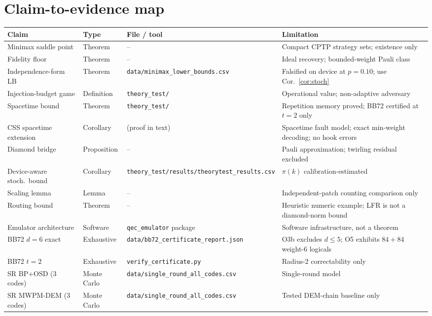 \documentclass[11pt,a4paper]{article}
\begin{document}
\section*{Claim-to-evidence map}
\begin{table}[H]\centering\scriptsize
\setlength{\tabcolsep}{3pt}
\renewcommand{\arraystretch}{1.08}
\begin{tabularx}{\textwidth}{@{}p{3.1cm}p{1.7cm}X p{2.9cm}@{}}
\toprule Claim & Type & File / tool & Limitation \\\midrule
Minimax saddle point & Theorem & -- & Compact CPTP strategy sets; existence only \\
Fidelity floor & Theorem & -- & Ideal recovery; bounded-weight Pauli class \\
Independence-form LB & Theorem & \texttt{data/minimax\_lower\_bounds.csv} & Falsified on device at $p{=}0.10$; use Cor.~\ref{cor:stoch} \\
Injection-budget game & Definition & \texttt{theory\_test/} & Operational value; non-adaptive adversary \\
Spacetime bound & Theorem & \texttt{theory\_test/} & Repetition memory proved; BB72 certified at $t{=}2$ only \\
CSS spacetime extension & Corollary & (proof in text) & Spacetime fault model; exact min-weight decoding; no hook errors \\
Diamond bridge & Proposition & -- & Pauli approximation; twirling residual excluded \\
Device-aware stoch.\ bound & Corollary & \texttt{theory\_test/results/theorytest\_results.csv} & $\pi(k)$ calibration-estimated \\
Scaling lemma & Lemma & -- & Independent-patch counting comparison only \\
Routing bound & Theorem & -- & Heuristic numeric example; LFR is not a diamond-norm bound \\
Emulator architecture & Software & \texttt{qec\_emulator} package & Software infrastructure, not a theorem \\
BB72 $d=6$ exact & Exhaustive & \texttt{data/bb72\_certificate\_report.json} & O3b excludes $d\le5$; O5 exhibits $84+84$ weight-6 logicals \\
BB72 $t=2$ & Exhaustive & \texttt{verify\_certificate.py} & Radius-2 correctability only \\
SR BP+OSD (3 codes) & Monte Carlo & \texttt{data/single\_round\_all\_codes.csv} & Single-round model \\
SR MWPM-DEM (3 codes) & Monte Carlo & \texttt{data/single\_round\_all\_codes.csv} & Tested DEM-chain baseline only \\

\end{tabularx}
\end{table}
\end{document}
